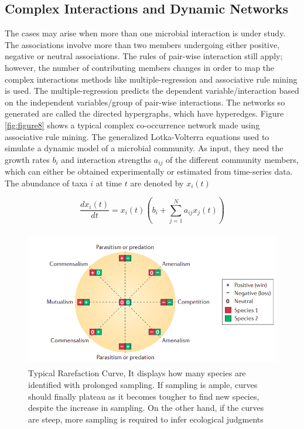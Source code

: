 \subsection{Complex Interactions and Dynamic Networks}
The cases may arise when more than one microbial interaction is under study. The associations involve more than two members undergoing either positive, negative or neutral associations. The rules of pair-wise interaction still apply; however, the number of contributing members changes in order to map the complex interactions methods like multiple-regression and associative rule mining is used. The multiple-regression predicts the dependent variable/interaction based on the independent variables/group of pair-wise interactions. The networks so generated are called the directed hypergraphs, which have hyperedges. Figure \ref{fig:figure8} shows a typical complex co-occurrence network made using associative rule mining. The generalized Lotka-Volterra equations used to simulate a dynamic model of a microbial community. As input, they need the growth rates $b_{i}$ and interaction strengths $a_{ij}$ of the different community members, which can either be obtained experimentally or estimated from time-series data. The abundance of taxa $i$ at time $t$ are denoted by $x_{i}(t)$

$$\frac{dx_{i}(t)}{dt} = x_{i}(t)(b_{i} + \sum^{N}_{j=1}a_{ij}x_{j}(t))$$


\begin{figure}
  \centering
  \includegraphics[width=12cm, height=6cm] {../figures/Figure6.png}
  \caption{Typical Rarefaction Curve, It displays how many species are identified with prolonged sampling. If sampling is ample, curves should finally plateau as it becomes tougher to find new species, despite the increase in sampling. On the other hand, if the curves are steep, more sampling is required to infer ecological judgments \cite{ref11}}
  \label{fig:figure6}
\end{figure}

